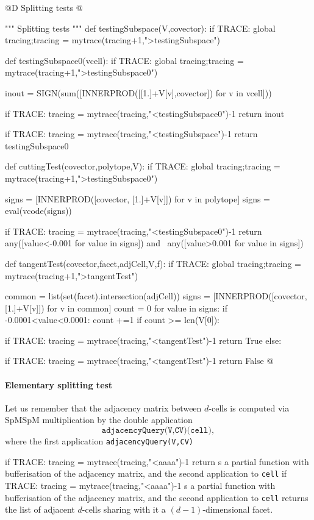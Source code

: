 \documentclass[11pt,oneside]{article}	%
\begin{document}
@D Splitting tests
@{""" Splitting tests """
def testingSubspace(V,covector):
	if TRACE: global tracing;tracing = mytrace(tracing+1,">testingSubspace")

	def testingSubspace0(vcell):
		if TRACE: global tracing;tracing = mytrace(tracing+1,">testingSubspace0")

		inout = SIGN(sum([INNERPROD([[1.]+V[v],covector]) for v in vcell]))

		if TRACE: tracing = mytrace(tracing,"<testingSubspace0")-1
		return inout

	if TRACE: tracing = mytrace(tracing,"<testingSubspace")-1
	return testingSubspace0
	
def cuttingTest(covector,polytope,V):
	if TRACE: global tracing;tracing = mytrace(tracing+1,">testingSubspace0")

	signs = [INNERPROD([covector, [1.]+V[v]]) for v in polytope]
	signs = eval(vcode(signs))

	if TRACE: tracing = mytrace(tracing,"<testingSubspace0")-1
	return any([value<-0.001 for value in signs]) and \
			any([value>0.001 for value in signs])
	
def tangentTest(covector,facet,adjCell,V,f):
	if TRACE: global tracing;tracing = mytrace(tracing+1,">tangentTest")

	common = list(set(facet).intersection(adjCell))
	signs = [INNERPROD([covector, [1.]+V[v]]) for v in common]
	count = 0
	for value in signs:
		if -0.0001<value<0.0001: count +=1
	if count >= len(V[0]): 

		if TRACE: tracing = mytrace(tracing,"<tangentTest")-1
		return True
	else: 

		if TRACE: tracing = mytrace(tracing,"<tangentTest")-1
		return False	
@}




\paragraph{Elementary splitting test}

Let us remember that the adjacency matrix between $d$-cells is computed via SpMSpM multiplication by the double application 
\[
\texttt{adjacencyQuery(V,CV)(cell)}, 
\] 
where the first application \texttt{adjacencyQuery(V,CV)}

if TRACE: tracing = mytrace(tracing,"<aaaa")-1
return
s a partial function with bufferisation of the adjacency matrix, and the second application to \texttt{cell} if TRACE: tracing = mytrace(tracing,"<aaaa")-1
s a partial function with bufferisation of the adjacency matrix, and the second application to \texttt{cell} returns the list of adjacent $d$-cells sharing with it a $(d-1)$-dimensional facet.
\end{document}
